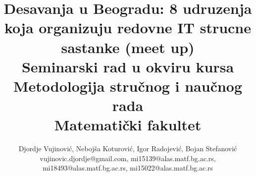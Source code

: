 \documentclass[a4paper]{article}
\begin{document}
\title{Desavanja u Beogradu: 8 udruzenja koja organizuju redovne IT strucne sastanke (meet up) \\ \small{Seminarski rad u okviru kursa\\Metodologija stručnog i naučnog rada\\ Matematički fakultet}}

\author{Djordje Vujinović, Nebojša Koturović, Igor Radojević, Bojan Stefanović\\ vujinovic.djordje@gmail.com, mi15139@alas.matf.bg.ac.rs, \\ mi18493@alas.matf.bg.ac.rs, mi15022@alas.matf.bg.ac.rs}


\maketitle
\end{document}
